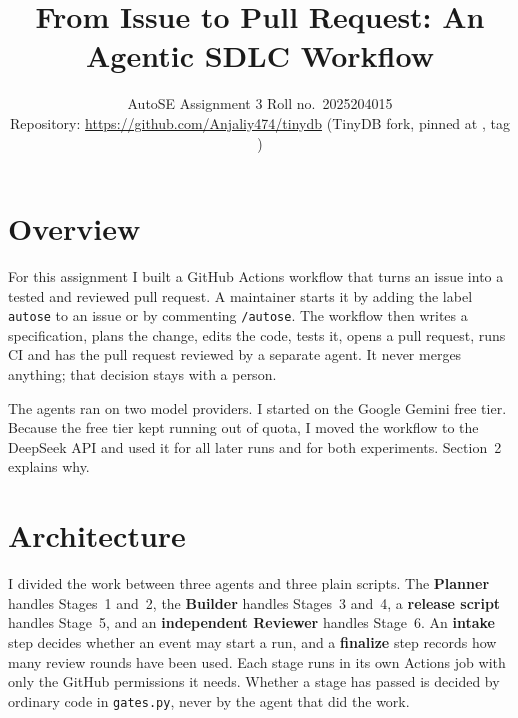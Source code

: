 \documentclass[10pt,a4paper]{article}
\title{\vspace{-1.2cm}From Issue to Pull Request: An Agentic SDLC Workflow}
\author{AutoSE Assignment 3 \quad Roll no.\ 2025204015\\[2pt]
\small Repository: \url{https://github.com/Anjaliy474/tinydb} (TinyDB fork, pinned at \code{edff96a}, tag \code{autose-base})}
\date{}
\newcommand{\code}[1]{\texttt{#1}}
\begin{document}
\maketitle
\vspace{-0.8cm}

\section*{Overview}
For this assignment I built a GitHub Actions workflow that turns an issue into a tested and reviewed
pull request. A maintainer starts it by adding the label \code{autose} to an issue or by commenting
\code{/autose}. The workflow then writes a specification, plans the change, edits the code, tests it,
opens a pull request, runs CI and has the pull request reviewed by a separate agent. It never merges
anything; that decision stays with a person.

The agents ran on two model providers. I started on the Google Gemini free tier. Because the free tier
kept running out of quota, I moved the workflow to the DeepSeek API and used it for all later runs and
for both experiments. Section~2 explains why.

\section{Architecture}

I divided the work between three agents and three plain scripts. The \textbf{Planner} handles
Stages~1 and~2, the \textbf{Builder} handles Stages~3 and~4, a \textbf{release script} handles
Stage~5, and an \textbf{independent Reviewer} handles Stage~6. An \textbf{intake} step decides whether
an event may start a run, and a \textbf{finalize} step records how many review rounds have been used.
Each stage runs in its own Actions job with only the GitHub permissions it needs. Whether a stage has
passed is decided by ordinary code in \code{gates.py}, never by the agent that did the work.
\end{document}
